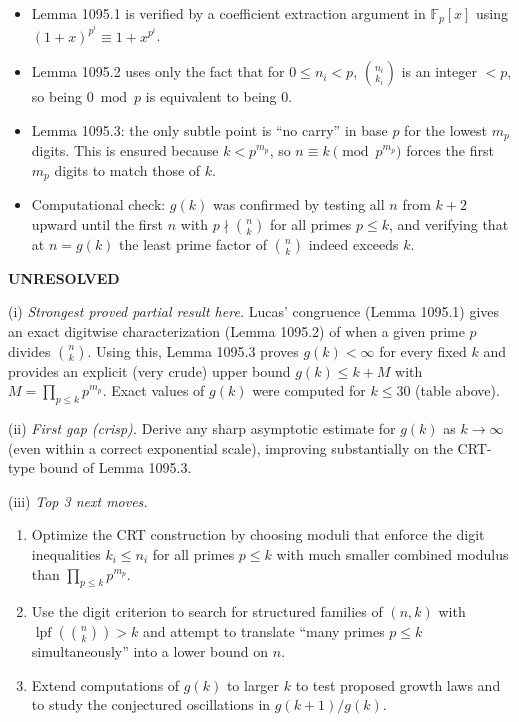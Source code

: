 \smallskip
\noindent
\begin{itemize}
\item Lemma 1095.1 is verified by a coefficient extraction argument in $\mathbb{F}_p[x]$ using $(1+x)^{p^i}\equiv 1+x^{p^i}$.
\item Lemma 1095.2 uses only the fact that for $0\le n_i<p$, $\binom{n_i}{k_i}$ is an integer $<p$, so being $0\bmod p$ is equivalent to being $0$.
\item Lemma 1095.3: the only subtle point is ``no carry'' in base $p$ for the lowest $m_p$ digits. This is ensured because $k<p^{m_p}$, so $n\equiv k\pmod{p^{m_p}}$ forces the first $m_p$ digits to match those of $k$.
\item Computational check: $g(k)$ was confirmed by testing all $n$ from $k+2$ upward until the first $n$ with $p\nmid\binom{n}{k}$ for all primes $p\le k$, and verifying that at $n=g(k)$ the least prime factor of $\binom{n}{k}$ indeed exceeds $k$.
\end{itemize}

\medskip
\noindent\textbf{UNRESOLVED}

\smallskip
\noindent
(i) \emph{Strongest proved partial result here.}
Lucas' congruence (Lemma 1095.1) gives an exact digitwise characterization (Lemma 1095.2) of when a given prime $p$ divides $\binom{n}{k}$. Using this, Lemma 1095.3 proves $g(k)<\infty$ for every fixed $k$ and provides an explicit (very crude) upper bound $g(k)\le k+M$ with $M=\prod_{p\le k}p^{m_p}$.
Exact values of $g(k)$ were computed for $k\le 30$ (table above).

\smallskip
\noindent
(ii) \emph{First gap (crisp).}
Derive any sharp asymptotic estimate for $g(k)$ as $k\to\infty$ (even within a correct exponential scale), improving substantially on the CRT-type bound of Lemma 1095.3.

\smallskip
\noindent
(iii) \emph{Top 3 next moves.}
\begin{enumerate}
\item Optimize the CRT construction by choosing moduli that enforce the digit inequalities $k_i\le n_i$ for all primes $p\le k$ with much smaller combined modulus than $\prod_{p\le k}p^{m_p}$.
\item Use the digit criterion to search for structured families of $(n,k)$ with $\operatorname{lpf}(\binom{n}{k})>k$ and attempt to translate ``many primes $p\le k$ simultaneously'' into a lower bound on $n$.
\item Extend computations of $g(k)$ to larger $k$ to test proposed growth laws and to study the conjectured oscillations in $g(k+1)/g(k)$.
\end{enumerate}

